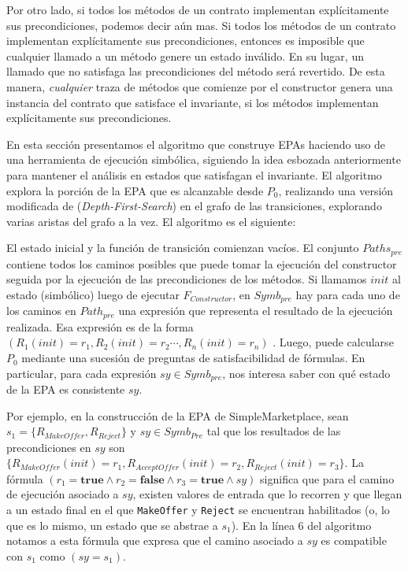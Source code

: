 Por otro lado, si todos los métodos de un contrato implementan explícitamente sus precondiciones, podemos decir aún mas.
Si todos los métodos de un contrato implementan explícitamente sus precondiciones, entonces es imposible que cualquier llamado a un método genere un estado inválido.
En su lugar, un llamado que no satisfaga las precondiciones del método será revertido.
De esta manera, \textit{cualquier} traza de métodos que comienze por el constructor genera una instancia del contrato que satisface el invariante, si los métodos implementan explícitamente sus precondiciones.

En esta sección presentamos el algoritmo que construye EPAs haciendo uso de una herramienta de ejecución simbólica, siguiendo la idea esbozada anteriormente para mantener el análisis en estados que satisfagan el invariante.
El algoritmo explora la porción de la EPA que es alcanzable desde $P_0$, realizando una versión	modificada de (\textit{Depth-First-Search}) en el grafo de las transiciones, explorando varias aristas del grafo a la vez.
El algoritmo es el siguiente:


%    

El estado inicial y la función de transición comienzan vacíos.
El conjunto ${Paths_{pre}}$ contiene todos los caminos posibles que puede tomar la ejecución del constructor seguida por la ejecución de las precondiciones de los métodos.
Si llamamos $init$ al estado (simbólico) luego de ejecutar $F_{Constructor}$, en $Symb_{pre}$ hay para cada uno de los caminos en $Path_{pre}$ una expresión que representa el resultado de la ejecución realizada. Esa expresión es de la forma $(R_1(init) = r_1 , R_2(init) = r_2 \cdots , R_n(init) = r_n)$ .
Luego, puede calcularse $P_0$ mediante una sucesión de preguntas de satisfacibilidad de fórmulas.
En particular, para cada expresión $sy \in Symb_{pre}$, nos interesa saber con qué estado de la EPA es consistente $sy$.

Por ejemplo, en la construcción de la EPA de SimpleMarketplace, sean $s_1 = \{R_{MakeOffer},R_{Reject}\}$ y $ sy \in Symb_{Pre}$ tal que los resultados de las precondiciones en $sy$ son $\{R_{MakeOffer}(init) = r_1, R_{AcceptOffer}(init) = r_2, R_{Reject}(init) = r_3\}$.
La fórmula $(r_1 = \textbf{true} \land r_2 = \textbf{false} \land r_3 = \textbf{true} \land sy)$ significa que para el camino de ejecución asociado a $sy$, existen valores de entrada que lo recorren y que llegan a un estado final en el que \texttt{MakeOffer} y \texttt{Reject} se encuentran habilitados (o, lo que es lo mismo, un estado que se abstrae a $s_1$).
En la línea 6 del algoritmo notamos a esta fórmula que expresa que el camino asociado a $sy$ es compatible con $s_1$ como $(sy = s_1)$.

